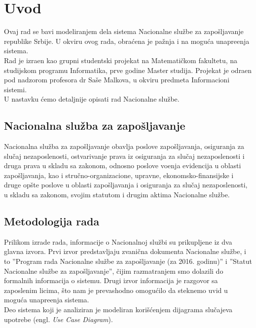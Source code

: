 \section{Uvod}

Ovaj rad se bavi modeliranjem dela sistema Nacionalne slu\v zbe za zapo\v sljavanje republike Srbije. U okviru ovog rada, obra\' cena je pa\v znja i na mogu\' ca unapre\dj enja sistema.\\

Rad je izra\dj en kao grupni studentski projekat na Matemati\v ckom fakultetu, na studijskom programu Informatika, prve godine Master studija. Projekat je odra\dj en pod nadzorom profesora dr Sa\v se Malkova, u okviru predmeta Informacioni sistemi.\\

U nastavku \' cemo detaljnije opisati rad Nacionalne slu\v zbe.

\subsection{Nacionalna slu\v zba za zapo\v sljavanje}

Nacionalna slu\v zba za zapo\v sljavanje obavlja poslove zapo\v sljavanja, osiguranja za slu\v caj nezaposlenosti, ostvarivanje prava iz osiguranja za slu\v caj nezaposlenosti i druga prava u skladu sa zakonom, odnosno poslove vo\dj enja evidencija u oblasti zapo\v sljavanja, kao i stru\v cno-organizacione, upravne, ekonomsko-finansijske i druge op\v ste poslove u oblasti zapo\v sljavanja i osiguranja za slu\v caj nezaposlenosti, u skladu sa zakonom, svojim statutom i drugim aktima Nacionalne slu\v zbe.

\subsection{Metodologija rada}

Prilikom izrade rada, informacije o Nacionalnoj slu\v zbi su prikupljene iz dva glavna izvora. Prvi izvor predstavljaju zvani\v cna dokumenta Nacionalne slu\v zbe, i to ''Program rada Nacionalne slu\v zbe za zapo\v sljavanje (za 2016. godinu)'' i ''Statut Nacionalne slu\v zbe za zapo\v sljavanje'', \v cijim razmatranjem smo dolazili do formalnih informacija o sistemu. Drugi izvor informacija je razgovor sa zaposlenim licima, \v sto nam je prevashodno omogu\' cilo da steknemo uvid u mogu\' ca unapre\dj enja sistema.\\

Deo sistema koji je analiziran je modeliran kori\v s\' cenjem dijagrama slu\v cajeva upotrebe (engl. \textit{Use Case Diagram}).

\newpage
